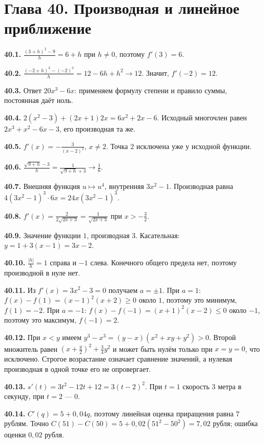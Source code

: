 \documentclass[12pt,a4paper,oneside,openany]{book}
\theoremstyle{colordef}\newtheorem{definition}{Определение}[chapter]
\theoremstyle{plain}\newtheorem{theorem}{Теорема}[chapter]
\theoremstyle{definition}\newtheorem{axiom}{Аксиома}[chapter]
\begin{document}
\section*{Глава 40. Производная и линейное приближение}
\begingroup\setlength{\parskip}{3pt}
\textbf{40.1.} \(\frac{(3+h)^2-9}{h}=6+h\) при \(h\ne0\), поэтому \(f'(3)=6\).\par
\textbf{40.2.} \(\frac{(-2+h)^3-(-2)^3}{h}=12-6h+h^2\to12\). Значит, \(f'(-2)=12\).\par
\textbf{40.3.} Ответ \(20x^3-6x\): применяем формулу степени и правило суммы, постоянная даёт ноль.\par
\textbf{40.4.} \(2(x^2-3)+(2x+1)2x=6x^2+2x-6\). Исходный многочлен равен \(2x^3+x^2-6x-3\), его производная та же.\par
\textbf{40.5.} \(f'(x)=-\frac3{(x-2)^2}\), \(x\ne2\). Точка \(2\) исключена уже у исходной функции.\par
\textbf{40.6.} \(\frac{\sqrt{9+h}-3}{h}=\frac1{\sqrt{9+h}+3}\to\frac16\).\par
\textbf{40.7.} Внешняя функция \(u\mapsto u^4\), внутренняя \(3x^2-1\). Производная равна \(4(3x^2-1)^3\cdot6x=24x(3x^2-1)^3\).\par
\textbf{40.8.} \(f'(x)=\frac{2}{2\sqrt{2x+3}}=\frac1{\sqrt{2x+3}}\) при \(x>-\frac32\).\par
\textbf{40.9.} Значение функции \(1\), производная \(3\). Касательная: \(y=1+3(x-1)=3x-2\).\par
\textbf{40.10.} \(\frac{|h|}{h}=1\) справа и \(-1\) слева. Конечного общего предела нет, поэтому производной в нуле нет.\par
\textbf{40.11.} Из \(f'(x)=3x^2-3=0\) получаем \(a=\pm1\). При \(a=1\): \(f(x)-f(1)=(x-1)^2(x+2)\ge0\) около \(1\), поэтому это минимум, \(f(1)=-2\). При \(a=-1\): \(f(x)-f(-1)=(x+1)^2(x-2)\le0\) около \(-1\), поэтому это максимум, \(f(-1)=2\).\par
\textbf{40.12.} При \(x<y\) имеем \(y^3-x^3=(y-x)(x^2+xy+y^2)>0\). Второй множитель равен \((x+\frac y2)^2+\frac34y^2\) и может быть нулём только при \(x=y=0\), что исключено. Строгое возрастание означает сравнение значений, а нулевая производная в одной точке его не опровергает.\par
\textbf{40.13.} \(s'(t)=3t^2-12t+12=3(t-2)^2\). При \(t=1\) скорость \(3\) метра в секунду, при \(t=2\) --- \(0\).\par
\textbf{40.14.} \(C'(q)=5+0{,}04q\), поэтому линейная оценка приращения равна \(7\) рублям. Точно \(C(51)-C(50)=5+0{,}02(51^2-50^2)=7{,}02\) рубля; ошибка оценки \(0{,}02\) рубля.\par
\end{document}
